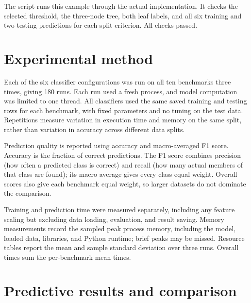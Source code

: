 \documentclass[11pt,letterpaper]{article}
\newcommand{\code}[1]{\texttt{\detokenize{#1}}}
\begin{document}
\begin{table}[!ht]\centering\small

\caption{Predictions for the two testing rows in the worked example.}
\label{tab:realpredictions}
\end{table}

The script \code{report/worked_example.py} runs this example through the
actual implementation. It checks the selected threshold, the three-node
tree, both leaf labels, and all six training and two testing predictions
for each split criterion. All checks passed.

\section{Experimental method}
\begin{table}[htbp]\centering\small

\caption{Computer specifications and software used for the experiments.}
\label{tab:environment}
\end{table}

Each of the six classifier configurations was run on all ten benchmarks three
times, giving 180 runs. Each run used a fresh process, and model computation
was limited to one thread. All classifiers used the same saved training and
testing rows for each benchmark, with fixed parameters and no tuning on the
test data. Repetitions measure variation in execution time and memory on the
same split, rather than variation in accuracy across different data splits.

Prediction quality is reported using accuracy and macro-averaged F1 score.
Accuracy is the fraction of correct predictions. The F1 score combines
precision (how often a predicted class is correct) and recall (how many actual
members of that class are found); its macro average gives every class equal
weight. Overall scores also give each benchmark equal weight, so larger
datasets do not dominate the comparison.

Training and prediction time were measured separately, including any feature
scaling but excluding data loading, evaluation, and result saving. Memory
measurements record the sampled peak process memory, including the model,
loaded data, libraries, and Python runtime; brief peaks may be missed.
Resource tables report the mean and sample standard deviation over three
runs. Overall times sum the per-benchmark mean times.

\section{Predictive results and comparison}
\end{document}
